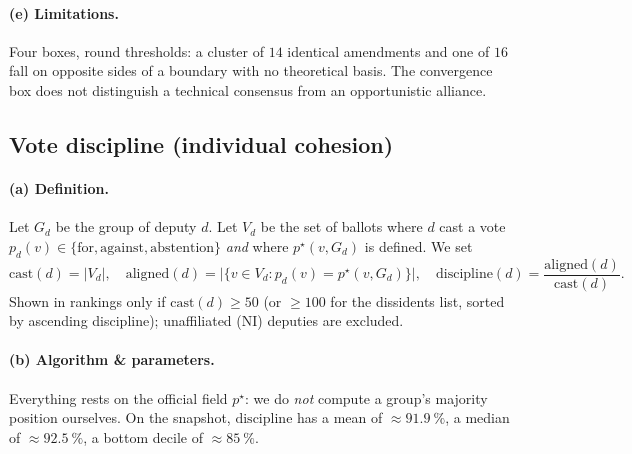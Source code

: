 \paragraph{(e) Limitations.} Four boxes, round thresholds: a cluster of $14$
identical amendments and one of $16$ fall on opposite sides of a boundary with no
theoretical basis. The \og{}convergence\fg{} box does not distinguish a technical
consensus from an opportunistic alliance.

\subsection{Vote discipline (individual cohesion)}\label{sec:discipline-en}

\paragraph{(a) Definition.} Let $G_d$ be the group of deputy $d$. Let $V_d$ be the
set of ballots where $d$ cast a vote $p_d(v)\in\{\text{for},\text{against},\text{abstention}\}$
\emph{and} where $p^\star(v,G_d)$ is defined. We set
\[
\mathrm{cast}(d)=|V_d|,\quad
\mathrm{aligned}(d)=\big|\{v\in V_d : p_d(v)=p^\star(v,G_d)\}\big|,\quad
\mathrm{discipline}(d)=\frac{\mathrm{aligned}(d)}{\mathrm{cast}(d)}.
\]
Shown in rankings only if $\mathrm{cast}(d)\ge 50$ (or $\ge 100$ for the
\og{}dissidents\fg{} list, sorted by ascending discipline); unaffiliated (NI)
deputies are excluded.

\paragraph{(b) Algorithm \& parameters.} Everything rests on the official field
$p^\star$: we do \emph{not} compute a group's majority position ourselves. On the
snapshot, $\mathrm{discipline}$ has a mean of $\approx 91.9~\%$, a median of
$\approx 92.5~\%$, a bottom decile of $\approx 85~\%$.

